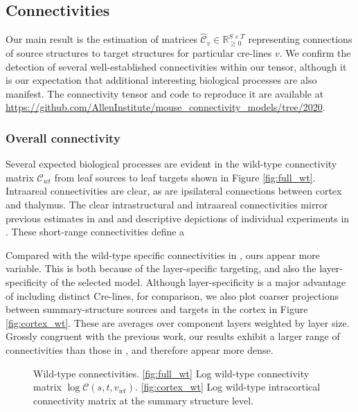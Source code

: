 \newpage

\subsection{Connectivities}

Our main result is the estimation of matrices $\hat {\mathcal C}_v \in \mathbb R_{\geq 0}^{S \times T}$ representing connections of source structures to target structures for particular cre-lines $v$. 
We confirm the detection of several well-established connectivities within our tensor, although it is our expectation that additional interesting biological processes are also manifest.
The connectivity tensor and code to reproduce it are available at \url{https://github.com/AllenInstitute/mouse_connectivity_models/tree/2020}.

\subsubsection{Overall connectivity}

Several expected biological processes are evident in the wild-type connectivity matrix $\mathcal C_{wt}$ from leaf sources to leaf targets shown in Figure \ref{fig:full_wt}.
Intraareal connectivities are clear, as are ipsilateral connections between cortex and thalymus.
The clear intrastructural and intraareal connectivities mirror previous estimates in \citet{Oh2014-kh} and \citet{Knox2019-ot} and descriptive depictions of individual experiments in \citet{Harris2019-mr}.
These short-range connectivities define a 

Compared with the wild-type specific connectivities in \citet{Knox2019-ot}, ours appear more variable.
This is both because of the layer-specific targeting, and also the layer-specificity of the selected model.
Although layer-specificity is a major advantage of including distinct Cre-lines, for comparison, we also plot coarser projections between summary-structure sources and targets in the cortex in Figure \ref{fig:cortex_wt}.
These are averages over component layers weighted by layer size.
Grossly congruent with the previous work, our results exhibit a larger range of connectivities than those in \citet{Knox2019-ot}, and therefore appear more dense.


\newpage

\begin{figure}[H]
\centering
        \newline
   \caption{Wild-type connectivities.
   \ref{fig:full_wt} Log wild-type connectivity matrix $\log \mathcal {C} (s,t,v_{wt})$.
   \ref{fig:cortex_wt} Log wild-type intracortical connectivity matrix at the summary structure level.}
   \label{fig:connectome}
\end{figure}

